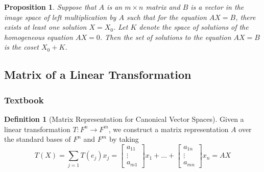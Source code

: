 \documentclass[12pt]{article}
\newtheorem{prop}[thm]{Proposition}
\theoremstyle{definition}
\newtheorem{defn}[thm]{Definition}
\theoremstyle{remark}
\numberwithin{equation}{section}
\begin{document}
\vspace{15pt}


\begin{prop}
        Suppose that $A$ is an $m\times n$ matrix and $B$ is a vector in the image space of left multiplication by $A$ such that for the equation $AX = B$, there exists at least one solution $X = X_0$. Let $K$ denote the space of solutions of the homogeneous equation $AX = 0$. Then the set of solutions to the equation $AX  = B$ is the coset $X_0 + K$.
\end{prop}

\vspace{15pt}


\subsection{Matrix of a Linear Transformation}

\subsubsection{Textbook}


\begin{defn}[Matrix Representation for Canonical Vector Spaces]
        Given a linear transformation $T:F^n \rightarrow F^m$, we construct a matrix representation $A$ over the standard bases of $F^n$ and $F^m$ by taking \begin{equation}
                T(X) = \sum\limits_{j=1}T(e_j)x_j = \begin{bmatrix} a_{11} \\ \vdots \\ a_{m1}\end{bmatrix}x_1+...+\begin{bmatrix} a_{1n} \\ \vdots \\ a_{mn}\end{bmatrix}x_n = AX
        \end{equation}
\end{defn}

\vspace{15pt}
\end{document}
